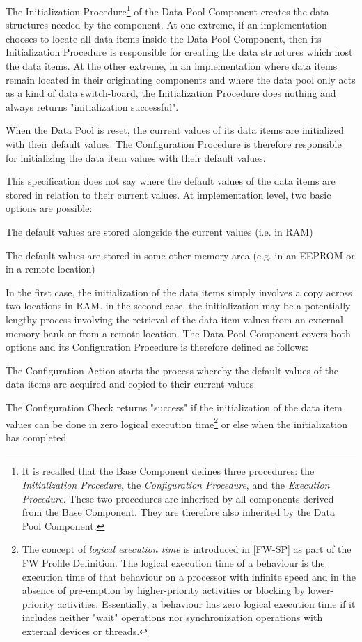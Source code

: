 \documentclass[a4paper,10pt]{article}
\newenvironment{fw_itemize}						%
{\begin{itemize}
  \setlength{\itemsep}{1mm}
  \setlength{\parskip}{0pt}
  \setlength{\parsep}{0pt}}
{\end{itemize}}
\newenvironment{fw_enumerate}					%
{\begin{enumerate}
  \setlength{\itemsep}{1mm}
  \setlength{\parskip}{0pt}
  \setlength{\parsep}{0pt}}
{\end{enumerate}}
\begin{document}
The Initialization Procedure\footnote{It is recalled that the Base Component defines three procedures: the \textit{Initialization Procedure}, the \textit{Configuration Procedure}, and the \textit{Execution Procedure}. These two procedures are inherited by all components derived from the Base Component. They are therefore also inherited by the Data Pool Component.} of the Data Pool Component creates the data structures needed by the component. At one extreme, if an implementation chooses to locate all data items inside the Data Pool Component, then its Initialization Procedure is responsible for creating the data structures which host the data items. At the other extreme, in an implementation where data items remain located in their originating components and where the data pool only acts as a kind of data switch-board, the Initialization Procedure does nothing and always returns "initialization successful".

When the Data Pool is reset, the current values of its data items are initialized with their default values. The Configuration Procedure is therefore responsible for initializing the data item values with their default values. 

This specification does not say where the default values of the data items are stored in relation to their current values. At implementation level, two basic options are possible:

\begin{fw_enumerate}
\item The default values are stored alongside the current values (i.e. in RAM)
\item The default values are stored in some other memory area (e.g. in an EEPROM or in a remote location)
\end{fw_enumerate}

In the first case, the initialization of the data items simply involves a copy across two locations in RAM. in the second case, the initialization may be a potentially lengthy process involving the retrieval of the data item values from an external memory bank or from a remote location. The Data Pool Component covers both options and its Configuration Procedure is therefore defined as follows:

\begin{fw_itemize}
\item The Configuration Action starts the process whereby the default values of the data items are acquired and copied to their current values
\item The Configuration Check returns "success" if the initialization of the data item values can be done in zero logical execution time\footnote{The concept of \textit{logical execution time} is introduced in [FW-SP] as part of the FW Profile Definition. The logical execution time of a behaviour is the execution time of that behaviour on a processor with infinite speed and in the absence of pre-emption by higher-priority activities or blocking by lower-priority activities. Essentially, a behaviour has zero logical execution time if it includes neither "wait" operations nor synchronization operations with external devices or threads.} or else when the initialization has completed 
\end{fw_itemize}
\end{document}
